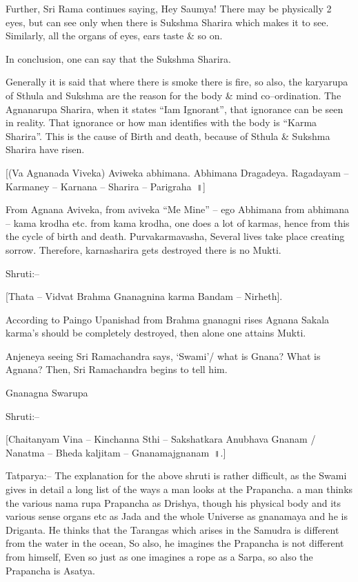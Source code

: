 Further, Sri Rama continues saying, Hey Saumya! There may be physically 2 eyes, but can see only when there is Sukshma Sharira which makes it to see. Similarly, all the organs of eyes, ears taste \& so on.

In conclusion, one can say that the Sukshma Sharira.

Generally it is said that where there is smoke there is fire, so also, the karyarupa of Sthula and Sukshma are the reason for the body \& mind co–ordination. The Agnanarupa Sharira, when it states “Iam Ignorant”, that ignorance can be seen in reality. That ignorance or how man identifies with the body is “Karma Sharira”. This is the cause of Birth and death, because of Sthula \& Sukshma Sharira have risen.

[(Va Agnanada Viveka) Aviweka abhimana. Abhimana Dragadeya. Ragadayam – Karmaney – Karnana – Sharira – Parigraha~॥]

From Agnana Aviveka, from aviveka “Me Mine” – ego Abhimana from abhimana – kama krodha etc. from kama krodha, one does a lot of karmas, hence from this the cycle of birth and death. Purvakarmavasha, Several lives take place creating sorrow. Therefore, karnasharira gets destroyed there is no Mukti.

Shruti:–

[Thata – Vidvat Brahma Gnanagnina karma Bandam – Nirheth].

According to Paingo Upanishad from Brahma gnanagni rises Agnana Sakala karma's should be completely destroyed, then alone one attains Mukti.

Anjeneya seeing Sri Ramachandra says, ‘Swami’/ what is Gnana? What is Agnana? Then, Sri Ramachandra begins to tell him.

Gnanagna Swarupa

Shruti:–

[Chaitanyam Vina – Kinchanna Sthi – Sakshatkara Anubhava Gnanam / Nanatma – Bheda kaljitam – Gnanamajgnanam~॥.]

Tatparya:– The explanation for the above shruti is rather difficult, as the Swami gives in detail a long list of the ways a man looks at the Prapancha. a man thinks the various nama rupa Prapancha as Drishya, though his physical body and its various sense organs etc as Jada and the whole Universe as gnanamaya and he is Driganta. He thinks that the Tarangas which arises in the Samudra is different from the water in the ocean, So also, he imagines the Prapancha is not different from himself, Even so just as one imagines a rope as a Sarpa, so also the Prapancha is Asatya.

